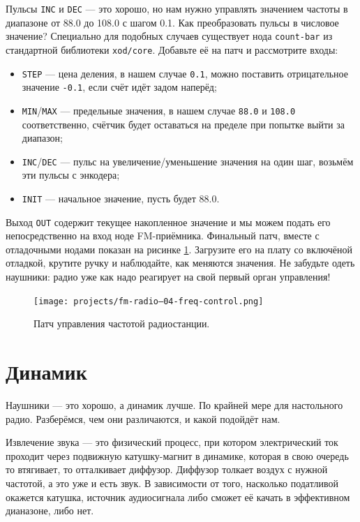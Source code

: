 Пульсы \texttt{INC} и \texttt{DEC} — это хорошо, но нам нужно управлять значением частоты в диапазоне от 88.0 до 108.0 с шагом 0.1. Как преобразовать пульсы в числовое значение? Специально для подобных случаев существует нода \texttt{count-bar} из стандартной библиотеки \texttt{xod/core}. Добавьте её на патч и рассмотрите входы:

\begin{itemize}
  \item \texttt{STEP} — цена деления, в нашем случае \texttt{0.1}, можно поставить отрицательное значение \texttt{-0.1}, если счёт идёт задом наперёд;
  \item \texttt{MIN}/\texttt{MAX} — предельные значения, в нашем случае \texttt{88.0} и \texttt{108.0} соответственно, счётчик будет оставаться на пределе при попытке выйти за диапазон;
  \item \texttt{INC}/\texttt{DEC} — пульс на увеличение/уменьшение значения на один шаг, возьмём эти пульсы с энкодера;
  \item \texttt{INIT} — начальное значение, пусть будет {88.0}.
\end{itemize}

Выход \texttt{OUT} содержит текущее накопленное значение и мы можем подать его непосредственно на вход ноде FM-приёмника. Финальный патч, вместе с отладочными нодами показан на рисинке \ref{patch:freq-control}. Загрузите его на плату со включёной отладкой, крутите ручку и наблюдайте, как меняются значения. Не забудьте одеть наушники: радио уже как надо реагирует на свой первый орган управления!

\begin{figure}
  \centering
  \texttt{[image: projects/fm-radio--04-freq-control.png]}
  \caption{Патч управления частотой радиостанции.}
  \label{patch:freq-control}
\end{figure}

\section{Динамик}

Наушники — это хорошо, а динамик лучше. По крайней мере для настольного радио. Разберёмся, чем они различаются, и какой подойдёт нам.

Извлечение звука — это физический процесс, при котором электрический ток проходит через подвижную катушку-магнит в динамике, которая в свою очередь то втягивает, то отталкивает диффузор. Диффузор толкает воздух с нужной частотой, а это уже и есть звук. В зависимости от того, насколько податливой окажется катушка, источник аудиосигнала либо сможет её качать в эффективном дианазоне, либо нет.

